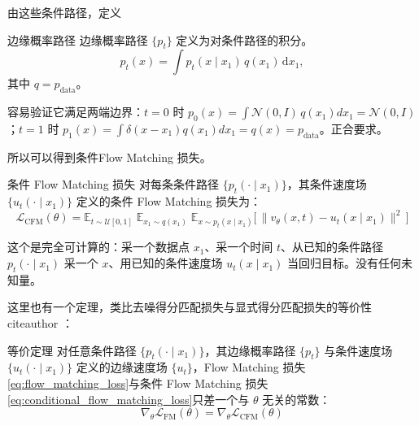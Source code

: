 由这些条件路径，定义
\begin{definition}{边缘概率路径}{}
    边缘概率路径 $\{p_t\}$ 定义为对条件路径的积分。
\begin{equation}\label{eq:marginal_probability_path}
p_t(x) = \int p_t(x\mid x_1)\, q(x_1)\, \mathrm{d}x_1,
\end{equation}
其中 $q = p_{\text{data}}$。
\end{definition}
容易验证它满足两端边界：$t=0$ 时 $p_0(x)=\int\mathcal N(0,I)\,q(x_1)dx_1=\mathcal N(0,I)$；$t=1$ 时 $p_1(x)=\int\delta(x-x_1)q(x_1)dx_1=q(x)=p_{\text{data}}$。正合要求。

所以可以得到条件Flow Matching 损失。
\begin{definition}{条件 Flow Matching 损失}{}
对每条条件路径 $\{p_t(\cdot\mid x_1)\}$，其条件速度场 $\{u_t(\cdot\mid x_1)\}$ 定义的条件 Flow Matching 损失为：
\begin{equation}\label{eq:conditional_flow_matching_loss}
\mathcal L_{\text{CFM}}(\theta)
= \mathbb{E}_{t\sim\mathcal U[0,1]}\;\mathbb{E}_{x_1\sim q(x_1)}\;\mathbb{E}_{x\sim p_t(x\mid x_1)}
\Big[\,\big\| v_\theta(x,t) - u_t(x\mid x_1)\big\|^2\,\Big]
\end{equation}
\end{definition}

这个是完全可计算的：采一个数据点 $x_1$、采一个时间 $t$、从已知的条件路径 $p_t(\cdot\mid x_1)$ 采一个 $x$、用已知的条件速度场 $u_t(x\mid x_1)$ 当回归目标。没有任何未知量。

这里也有一个定理，类比去噪得分匹配损失与显式得分匹配损失的等价性citeauthor
\cite{lipman2023flowmatchinggenerativemodeling}：
\begin{theorem}{等价定理}{}
    对任意条件路径 $\{p_t(\cdot\mid x_1)\}$，其边缘概率路径 $\{p_t\}$ 与条件速度场 $\{u_t(\cdot\mid x_1)\}$ 定义的边缘速度场 $\{u_t\}$，Flow Matching 损失\eqref{eq:flow_matching_loss}与条件 Flow Matching 损失\eqref{eq:conditional_flow_matching_loss}只差一个与 $\theta$ 无关的常数：
\begin{equation}\label{eq:flow_matching_equivalence}
\boxed{\;\nabla_\theta \mathcal L_{\text{FM}}(\theta) = \nabla_\theta \mathcal L_{\text{CFM}}(\theta)\;}
\end{equation}
\end{theorem}

